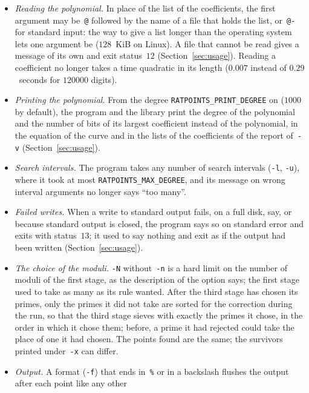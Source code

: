 \documentclass[12pt,a4paper,oneside]{amsart}
\begin{document}
\begin{itemize}
  \item \emph{Reading the polynomial.} In place of the list of the
        coefficients, the first argument may be~\verb+@+ followed by the
        name of a file that holds the list, or~\verb+@-+ for standard
        input: the way to give a list longer than the operating system
        lets one argument be ($128$~KiB on Linux). A file that cannot be
        read gives a message of its own and exit status~$12$
        (Section~\ref{sec:usage}). Reading a coefficient no longer takes a
        time quadratic in its length ($0.007$ instead of $0.29$~seconds
        for $120000$ digits).
  \item \emph{Printing the polynomial.} From the degree
        \texttt{RATPOINTS\_PRINT\_DEGREE} on ($1000$ by default), the
        program and the library print the degree of the polynomial and the
        number of bits of its largest coefficient instead of the
        polynomial, in the equation of the curve and in the lists of the
        coefficients of the report of~\verb+-v+
        (Section~\ref{sec:usage}).
  \item \emph{Search intervals.} The program takes any number of search
        intervals (\verb+-l+, \verb+-u+), where it took at most
        \texttt{RATPOINTS\_MAX\_DEGREE}, and its message on wrong interval
        arguments no longer says ``too many''.
  \item \emph{Failed writes.} When a write to standard output fails, on a
        full disk, say, or because standard output is closed, the program
        says so on standard error and exits with status~$13$; it used to
        say nothing and exit as if the output had been written
        (Section~\ref{sec:usage}).
  \item \emph{The choice of the moduli.} \verb+-N+ without~\verb+-n+ is a
        hard limit on the number of moduli of the first stage, as the
        description of the option says; the first stage used to take as
        many as its rule wanted. After the third stage has chosen its
        primes, only the primes it did not take are sorted for the
        correction during the run, so that the third stage sieves with
        exactly the primes it chose, in the order in which it chose them;
        before, a prime it had rejected could take the place of one it had
        chosen. The points found are the same; the survivors printed
        under~\verb+-x+ can differ.
  \item \emph{Output.} A format (\verb+-f+) that ends in~\verb+%+ or in a
        backslash flushes the output after each point like any other

\end{itemize}
\end{document}
